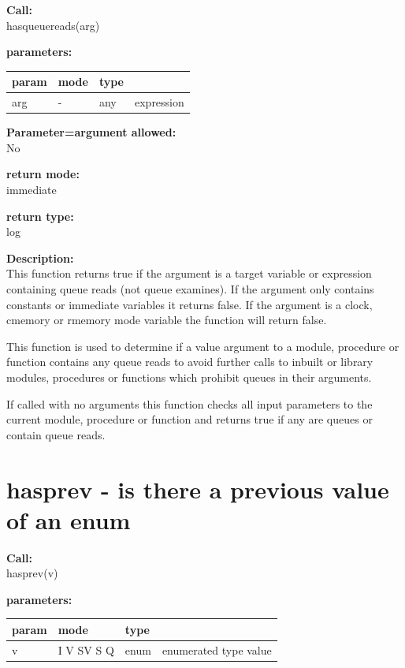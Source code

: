         {\bf Call:} \\
        hasqueuereads(arg)
        
        {\bf parameters:} \\
        \begin{tabular}{| l | l | l | l |}
        \hline
        param  & mode & type & \\
        \hline \hline
        arg & - & any & expression  \\ \hline
        \end{tabular}
        
        {\bf Parameter=argument allowed:} \\
        No
        
        {\bf return mode:} \\
        immediate

        {\bf return type:} \\
        log
        
        {\bf Description:} \\
        This function returns true if the argument is a target variable or
        expression containing queue reads (not queue examines). If the argument
        only contains constants or immediate variables it returns false. If the
        argument is a clock, cmemory or rmemory mode variable the function will
        return false.
        
        This function is used to determine if a value argument to a module,
        procedure or function contains any queue reads to avoid further
        calls to inbuilt or library modules, procedures or functions
        which prohibit queues in their arguments.
        
        If called with no arguments this function checks all input parameters
        to the current module, procedure or function and returns true if
        any are queues or contain queue reads.
 


    \section{hasprev - is there a previous value of an enum}\label{sec:ifhasprev}
        
        {\bf Call:} \\
        hasprev(v)
        
        {\bf parameters:} \\
        \begin{tabular}{| l | l | l | l |}
        \hline
        param  & mode & type & \\
        \hline \hline
        v & I V SV S Q & enum & enumerated type value \\ \hline
        \end{tabular}
        
